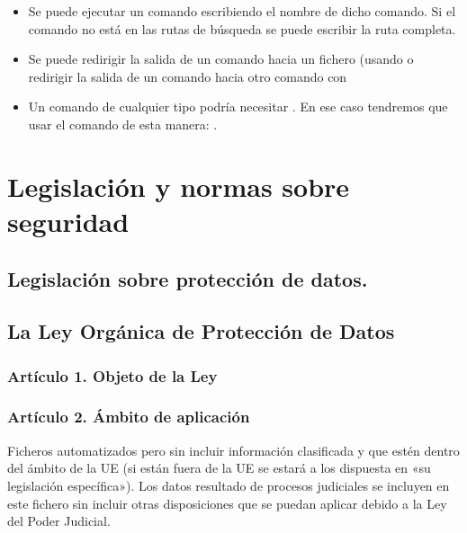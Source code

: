 \documentclass[letterpaper,10pt,spanish]{sphinxmanual}
\begin{document}
\begin{itemize}
\item {} 
Se puede ejecutar un comando escribiendo el nombre de dicho comando. Si el comando no está en las rutas de búsqueda se puede escribir la ruta completa.

\item {} 
Se puede redirigir la salida de un comando hacia un fichero (usando   o redirigir la salida de un comando hacia otro comando con 

\item {} 
Un comando de cualquier tipo podría necesitar . En ese caso tendremos que usar el comando  de esta manera:  .

\end{itemize}


\chapter{Legislación y normas sobre seguridad}
\label{\detokenize{tema_lopd/tema_lopd:legislacion-y-normas-sobre-seguridad}}\label{\detokenize{tema_lopd/tema_lopd::doc}}

\section{Legislación sobre protección de datos.}
\label{\detokenize{tema_lopd/tema_lopd:legislacion-sobre-proteccion-de-datos}}

\section{La Ley Orgánica de Protección de Datos}
\label{\detokenize{tema_lopd/tema_lopd:la-ley-organica-de-proteccion-de-datos}}

\subsection{Artículo 1. Objeto de la Ley}
\label{\detokenize{tema_lopd/tema_lopd:articulo-1-objeto-de-la-ley}}

\subsection{Artículo 2. Ámbito de aplicación}
\label{\detokenize{tema_lopd/tema_lopd:articulo-2-ambito-de-aplicacion}}
Ficheros automatizados pero sin incluir información clasificada y que estén dentro del ámbito de la UE (si están fuera de la UE se estará a los dispuesta en «su legislación específica»). Los datos resultado de procesos judiciales se incluyen en este fichero sin incluir otras disposiciones que se puedan aplicar debido a la Ley del Poder Judicial.
\end{document}
